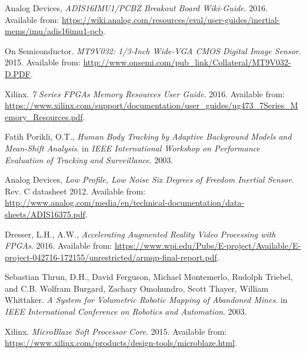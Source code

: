 \begin{thebibliography}{100}
 Analog Devices, \textit{ADIS16IMU1/PCBZ Breakout Board Wiki-Guide}. 2016. Available from: \url{https://wiki.analog.com/resources/eval/user-guides/inertial-mems/imu/adis16imu1-pcb}.

 On Semiconductor. 
\textit{MT9V032: 1/3-Inch Wide-VGA CMOS Digital Image Sensor}. 2015. 
Available from: \url{http://www.onsemi.com/pub_link/Collateral/MT9V032-D.PDF}.

 Xilinx. \textit{7 Series FPGAs Memory Resources User Guide}. 2016. Available from: \url{https://www.xilinx.com/support/documentation/user_guides/ug473_7Series_Memory_Resources.pdf}.

 Fatih Porikli, O.T.,
\textit{Human Body Tracking by Adaptive Background Models and Mean-Shift Analysis}.
in \textit{IEEE International Workshop on Performance Evaluation of Tracking and Surveillance}. 2003.

 Analog Devices, \textit{Low Profile, Low Noise Six Degrees of Freedom Inertial Sensor}. Rev. C datasheet 2012. Available from: \url{http://www.analog.com/media/en/technical-documentation/data-sheets/ADIS16375.pdf}.

 Dresser, L.H., A.W., \textit{Accelerating Augmented Reality Video Processing with FPGAs}. 2016. Available from: \url{https://www.wpi.edu/Pubs/E-project/Available/E-project-042716-172155/unrestricted/armqp-final-report.pdf}.

 Sebastian Thrun, D.H., David Ferguson, Michael Montemerlo, Rudolph Triebel, and C.B. Wolfram Burgard, Zachary Omohundro, Scott Thayer, William Whittaker.
\textit{A System for Volumetric Robotic Mapping of Abandoned Mines}. 
in \textit{IEEE International Conference on Robotics and Automation}. 2003.

 Xilinx. \textit{MicroBlaze Soft Processor Core}. 2015. Available from: \url{https://www.xilinx.com/products/design-tools/microblaze.html}.


\end{thebibliography}

\newpage{\pagestyle{empty}\cleardoublepage}